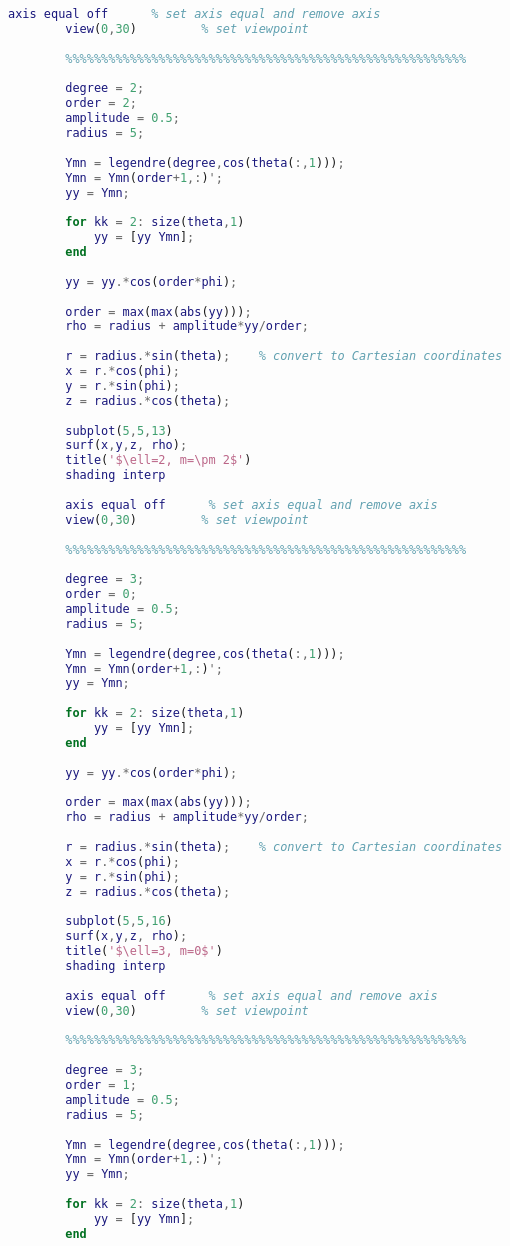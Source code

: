 \begin{lstlisting}[language=MATLAB]
		axis equal off      % set axis equal and remove axis
		view(0,30)         % set viewpoint
		
		%%%%%%%%%%%%%%%%%%%%%%%%%%%%%%%%%%%%%%%%%%%%%%%%%%%%%%%%
		
		degree = 2;
		order = 2;
		amplitude = 0.5;
		radius = 5;
		
		Ymn = legendre(degree,cos(theta(:,1)));
		Ymn = Ymn(order+1,:)';
		yy = Ymn;
		
		for kk = 2: size(theta,1)
		    yy = [yy Ymn];
		end
		
		yy = yy.*cos(order*phi);
		
		order = max(max(abs(yy)));
		rho = radius + amplitude*yy/order;
		
		r = radius.*sin(theta);    % convert to Cartesian coordinates
		x = r.*cos(phi);
		y = r.*sin(phi);
		z = radius.*cos(theta);
		
		subplot(5,5,13)
		surf(x,y,z, rho);
		title('$\ell=2, m=\pm 2$')
		shading interp
		
		axis equal off      % set axis equal and remove axis
		view(0,30)         % set viewpoint
		
		%%%%%%%%%%%%%%%%%%%%%%%%%%%%%%%%%%%%%%%%%%%%%%%%%%%%%%%%
		
		degree = 3;
		order = 0;
		amplitude = 0.5;
		radius = 5;
		
		Ymn = legendre(degree,cos(theta(:,1)));
		Ymn = Ymn(order+1,:)';
		yy = Ymn;
		
		for kk = 2: size(theta,1)
		    yy = [yy Ymn];
		end
		
		yy = yy.*cos(order*phi);
		
		order = max(max(abs(yy)));
		rho = radius + amplitude*yy/order;
		
		r = radius.*sin(theta);    % convert to Cartesian coordinates
		x = r.*cos(phi);
		y = r.*sin(phi);
		z = radius.*cos(theta);
		
		subplot(5,5,16)
		surf(x,y,z, rho);
		title('$\ell=3, m=0$')
		shading interp
		
		axis equal off      % set axis equal and remove axis
		view(0,30)         % set viewpoint
		
		%%%%%%%%%%%%%%%%%%%%%%%%%%%%%%%%%%%%%%%%%%%%%%%%%%%%%%%%
		
		degree = 3;
		order = 1;
		amplitude = 0.5;
		radius = 5;
		
		Ymn = legendre(degree,cos(theta(:,1)));
		Ymn = Ymn(order+1,:)';
		yy = Ymn;
		
		for kk = 2: size(theta,1)
		    yy = [yy Ymn];
		end
		

\end{lstlisting}

